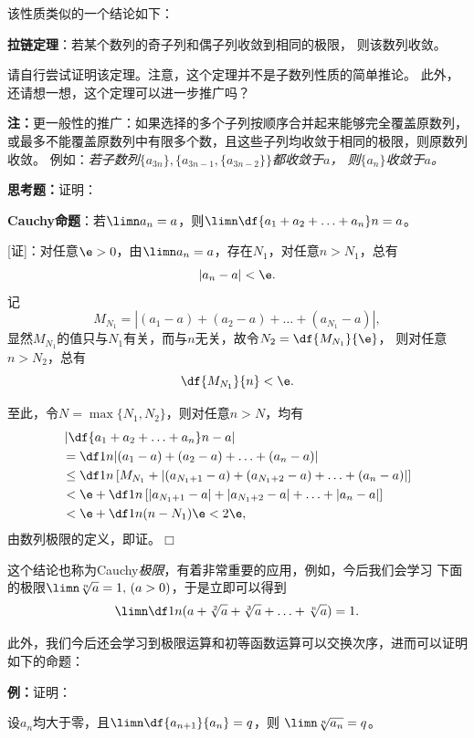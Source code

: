 该性质类似的一个结论如下：
\begin{thx}
	{\bf 拉链定理}：若某个数列的奇子列和偶子列收敛到相同的极限，
	则该数列收敛。
\end{thx}

请自行尝试证明该定理。注意，这个定理并不是子数列性质的简单推论。
此外，还请想一想，这个定理可以进一步推广吗？

{\bf 注：}更一般性的推广：如果选择的多个子列按顺序合并起来能够完全覆盖原数列，
或最多不能覆盖原数列中有限多个数，且这些子列均收敛于相同的极限，则原数列收敛。
例如：{\it 若子数列$\{a_{3n}\},\{a_{3n-1},\{a_{3n-2}\}\}$都收敛于$a$，
则$\{a_{n}\}$收敛于$a$。}

\begin{shaded}

{\bf 思考题：}证明：

\begin{tcolorbox}
	{\bf Cauchy命题}：若$\limn a_n=a$，则$\limn\df{a_1+a_2+\ldots+a_n}n=a$。
\end{tcolorbox}

[证]：对任意$\e>0$，由$\limn a_n=a$，存在$N_1$，对任意$n>N_1$，总有
$$|a_n-a|<\e.$$
记
$$M_{N_1}=|(a_1-a)+(a_2-a)+\ldots+(a_{N_1}-a)|,$$
显然$M_{N_1}$的值只与$N_1$有关，而与$n$无关，故令$N_2=\df{M_{N_1}}{\e}$，
则对任意$n>N_2$，总有
$$\df{M_{N_1}}{n}<\e.$$

至此，令$N=\max\{N_1,N_2\}$，则对任意$n>N$，均有
\begin{align*}
	&\left|\df{a_1+a_2+\ldots+a_n}n-a\right|\\
	&=\df1n|(a_1-a)+(a_2-a)+\ldots+(a_n-a)|\\
	&\leq\df1n\left[M_{N_1}
	+|(a_{{N_1}+1}-a)+(a_{{N_1}+2}-a)+\ldots+(a_n-a)|\right]\\
	&<\e+\df1n\left[|a_{{N_1}+1}-a|+|a_{{N_1}+2}-a|
	+\ldots+|a_n-a|\right]\\
	&<\e+\df1n(n-{N_1})\e<2\e,
\end{align*}
由数列极限的定义，即证。\hfill$\Box$

这个结论也称为Cauchy{\it 极限}，有着非常重要的应用，例如，今后我们会学习
下面的极限$\limn\sqrt[n]a=1,\,(a>0)$，于是立即可以得到
$$\limn\df1n(a+\sqrt[2]a+\sqrt[3]a+\ldots+\sqrt[n]a)=1.$$

此外，我们今后还会学习到极限运算和初等函数运算可以交换次序，进而可以证明如下的命题：

{\bf 例：}证明：
\begin{tcolorbox}
	设$a_n$均大于零，且$\limn\df{a_{n+1}}{a_n}=q$，则
	$\limn\sqrt[n]{a_n}=q$。	
\end{tcolorbox}



\end{shaded}
